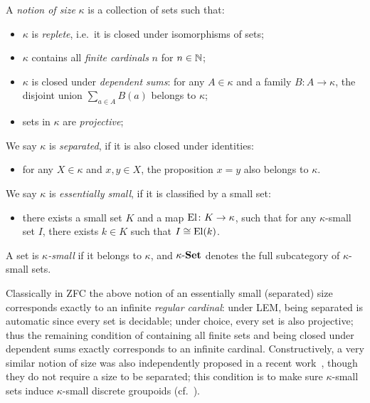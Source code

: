 \begin{definition}[Size]\label{def:size}
  A \emph{notion of size} $\kappa$ is a collection of sets such that:
  \begin{itemize}
    \item $\kappa$ is \emph{replete}, i.e.\ it is closed under isomorphisms of sets;
    \item $\kappa$ contains all \emph{finite cardinals} $n$ for $n\in\mathbb{N}$;
    \item $\kappa$ is closed under \emph{dependent sums}: for any $A \in \kappa$ and a family $B \colon A \to \kappa$, the disjoint union $\sum_{a\in A}B(a)$ belongs to $\kappa$;
    \item sets in $\kappa$ are \emph{projective};
  \end{itemize}
  We say $\kappa$ is \emph{separated}, if it is also closed under identities:
  \begin{itemize}
    \item for any $X\in\kappa$ and $x,y\in X$, the proposition $x = y$ also belongs to $\kappa$.
  \end{itemize}
  We say $\kappa$ is \emph{essentially small}, if it is classified by a small set:
  \begin{itemize}
    \item there exists a small set $K$ and a map $\mathrm{El} \colon K \to \kappa$, such that for any $\kappa$-small set $I$, there exists $k\in K$ such that $I \cong \mathrm{El}(k)$.
  \end{itemize}
  A set is \emph{$\kappa$-small} if it belongs to $\kappa$, and $\kappa\text{-}\mathbf{Set}$ denotes the full subcategory of $\kappa$-small sets.
\end{definition}

\begin{remark}\label{rem:comparethenotionofsize}
  Classically in \gls{ZFC} the above notion of an essentially small (separated) size corresponds exactly to an infinite \emph{regular cardinal}: under \gls{LEM}, being separated is automatic since every set is decidable; under choice, every set is also projective; thus the remaining condition of containing all finite sets and being closed under dependent sums exactly corresponds to an infinite cardinal. Constructively, a very similar notion of size was also independently proposed in a recent work~\citet{coquand_et_al:LIPIcs.LICS.2026.31}, though they do not require a size to be separated; this condition is to make sure $\kappa$-small sets induce $\kappa$-small discrete groupoids (cf.~).
\end{remark}

